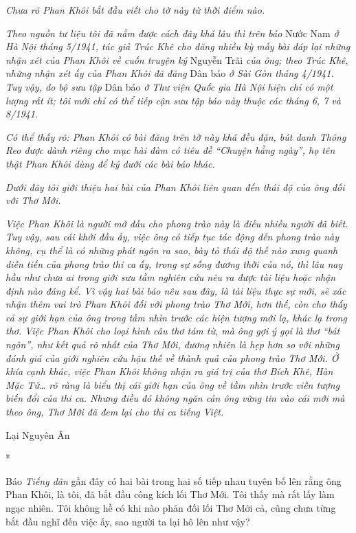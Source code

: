 \documentclass[../main.tex]{subfiles}
\begin{document}
\begin{multicols}{2}
\textit{Chưa rõ Phan Khôi bắt đầu viết cho tờ này từ thời điểm nào. } 
 
\textit{Theo nguồn tư liệu tôi đã nắm được cách đây khá lâu thì trên báo }Nước Nam\textit{ ở Hà Nội tháng 5/1941, tác giả Trúc Khê cho đăng nhiều kỳ mấy bài đáp lại những nhận xét của Phan Khôi về cuốn truyện ký }Nguyễn Trãi \textit{của ông; theo Trúc Khê}, \textit{những nhận xét ấy của Phan Khôi đã đăng }Dân báo\textit{ ở Sài Gòn tháng 4/1941. Tuy vậy, do bộ sưu tập }Dân báo \textit{ở Thư viện Quốc gia Hà Nội hiện chỉ có một lượng rất ít; tôi mới chỉ có thể tiếp cận sưu tập báo này thuộc các tháng 6, 7 và 8/1941. } 
 
\textit{Có thể thấy rõ: Phan Khôi có bài đăng trên tờ này khá đều đặn, bút danh Thông Reo được dành riêng cho mục hài đàm có tiêu đề “Chuyện hằng ngày”, họ tên thật Phan Khôi dùng để ký dưới các bài báo khác. } 
 
\textit{Dưới đây tôi giới thiệu hai bài của Phan Khôi liên quan đến thái độ của ông đối với Thơ Mới. } 
 
\textit{Việc Phan Khôi là người mở đầu cho phong trào này là điều nhiều người đã biết. Tuy vậy, sau cái khởi đầu ấy, việc ông có tiếp tục tác động đến phong trào này không, cụ thể là có những phát ngôn ra sao, bày tỏ thái độ thế nào xung quanh diễn tiến của phong trào thi ca ấy, trong sự sống đương thời của nó, thì lâu nay hầu như chưa ai trong giới sưu tầm nghiên cứu nêu ra được tài liệu hoặc nhận định nào đáng kể. Vì vậy hai bài báo nêu sau đây, là tài liệu thực sự mới, sẽ xác nhận thêm vai trò Phan Khôi đối với phong trào Thơ Mới, hơn thế, còn cho thấy cả sự giới hạn của ông trong tầm nhìn trước các hiện tượng mới lạ, khác lạ trong thơ. Việc Phan Khôi cho loại hình câu thơ tám từ, mà ông gợi ý gọi là thơ “bát ngôn”, như kết quả rõ nhất của Thơ Mới, đương nhiên là hẹp hơn so với những đánh giá của giới nghiên cứu hậu thế về thành quả của phong trào Thơ Mới.} \textit{Ở khía cạnh khác, việc Phan Khôi không nhận ra giá trị của thơ Bích Khê, Hàn Mặc Tử… rõ ràng là biểu thị cái giới hạn của ông về tầm nhìn trước viễn tượng biến đổi của thi ca. Nhưng điều đó không ngăn cản ông vững tin vào cái mới mà theo ông, Thơ Mới đã đem lại cho thi ca tiếng Việt.} 
 
Lại Nguyên Ân 
                                                                      \begin{center}
*\end{center}
 
Báo \textit{Tiếng dân} gần đây có hai bài trong hai số tiếp nhau tuyên bố lên rằng ông Phan Khôi, là tôi, đã bắt đầu công kích lối Thơ Mới. Tôi thấy mà rất lấy làm ngạc nhiên. Tôi không hề có khi nào phản đối lối Thơ Mới cả, cũng chưa từng bắt đầu nghĩ đến việc ấy, sao người ta lại hô lên như vậy? 
 

\end{multicols}
\end{document}
